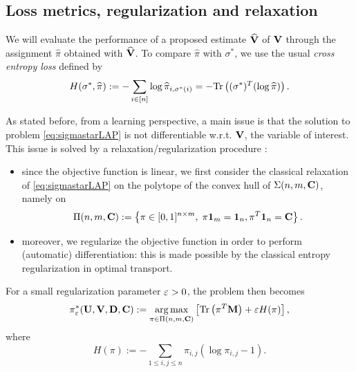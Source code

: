 \subsection*{Loss metrics, regularization and relaxation}
We will evaluate the performance of a proposed estimate $\widehat{\mathbf{V}}$ of $\mathbf{V}$ through the assignment $\widehat{\pi}$ obtained with $\widehat{\mathbf{V}}$. To compare $\widehat{\pi}$ with $\sigma^*$, we use the usual \emph{cross entropy loss} defined by
\begin{equation*}
    H(\sigma^*,\widehat{\pi}) := - \sum_{i \in [n]} \log{\widehat{\pi}_{i,\sigma^*(i)}} = - {\rm Tr}\left( (\sigma^*)^T (\log \widehat{\pi}) \right).
\end{equation*}



As stated before, from a learning perspective, a main issue is that the solution to problem \eqref{eq:sigmastarLAP} is not differentiable w.r.t. $\mathbf{V}$, the variable of interest. This issue is solved by a relaxation/regularization procedure \cite{cuturi_sinkhorn_2013}:
\begin{itemize}
    \item since the objective function is linear, we first consider the classical relaxation of \eqref{eq:sigmastarLAP} on the polytope of the convex hull of $\Sigma(n,m,\mathbf{C})$, namely on
    \begin{equation*}\label{eq:defPi}
    \Pi(n,m,\mathbf{C}) := \left\lbrace \pi \in [0,1]^{n \times m}, \; {\pi \mathbf{1}_m}  = { \mathbf{1}_n}, {\pi^T \mathbf{1}_n} = \mathbf{C} \right\rbrace.
    \end{equation*}
    \item moreover, we regularize the objective function in order to perform (automatic) differentiation: this is made possible by the classical entropy regularization in optimal transport.
\end{itemize}
For a small regularization parameter $\varepsilon>0$, the problem then becomes
\begin{equation}\label{eq:piSinkhorn}
    \pi_{\varepsilon}^*(\mathbf{U},\mathbf{V},\mathbf{D},\mathbf{C}) := \operatorname*{arg\,max}_{\pi \in \Pi(n,m,\mathbf{C})} \left[{\rm Tr}\left( \pi^T \mathbf{M} \right) + \varepsilon H(\pi) \right],
\end{equation} where
\begin{equation}\label{eq:Hpi}
    H(\pi) := - \sum_{1 \leq i,j \leq n} \pi_{i,j} (\log \pi_{i,j}-1).
\end{equation}


